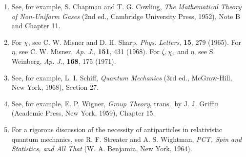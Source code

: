 \begin{enumerate}
  \item {}\label{ch2-ref-9}
  See, for example, S. Chapman and T. G. Cowling,
  \emph{The Mathematical Theory of Non-Uniform Gases}
  (2nd ed., Cambridge University Press, 1952), Note B and Chapter 11.

  \item {}\label{ch2-ref-10}
  For \(\chi\), see C. W. Misner and D. H. Sharp,
  \emph{Phys. Letters}, \textbf{15}, 279 (1965).
  For \(\eta\), see C. W. Misner, \emph{Ap. J.}, \textbf{151}, 431 (1968).
  For \(\zeta,\chi,\) and \(\eta\), see S. Weinberg,
  \emph{Ap. J.}, \textbf{168}, 175 (1971).

  \item {}\label{ch2-ref-11}
  See, for example, L. I. Schiff, \emph{Quantum Mechanics}
  (3rd ed., McGraw-Hill, New York, 1968), Section 27.

  \item {}\label{ch2-ref-12}
  See, for example, E. P. Wigner, \emph{Group Theory}, trans.\ by
  J. J. Griffin (Academic Press, New York, 1959), Chapter 15.

  \item {}\label{ch2-ref-13}
  For a rigorous discussion of the necessity of antiparticles in relativistic
  quantum mechanics, see R. F. Streater and A. S. Wightman,
  \emph{PCT, Spin and Statistics, and All That}
  (W. A. Benjamin, New York, 1964).
\end{enumerate}
